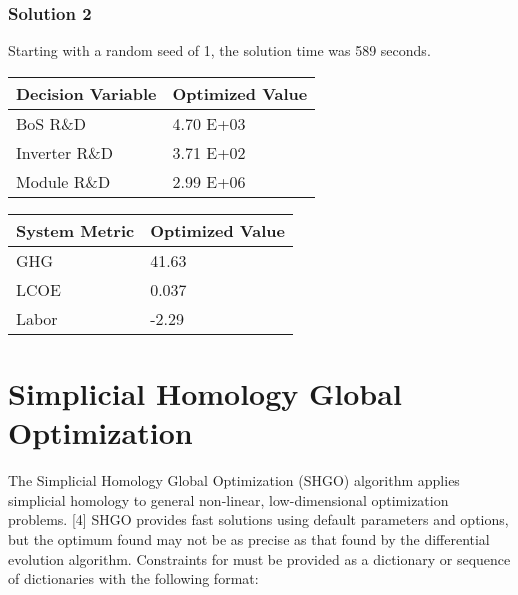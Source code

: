 \documentclass[letterpaper,10pt,english]{sphinxmanual}
\begin{document}
\subsubsection{Solution 2}
\label{\detokenize{optimizers:solution-2}}
Starting with a random seed of 1, the solution time was 589 seconds.


\begin{savenotes}\sphinxattablestart
\centering
{}
\sphinxthecaptionisattop
{}\label{\detokenize{optimizers:table-6}}\label{\detokenize{optimizers:tbl-diffevvars2}}
\sphinxaftertopcaption
\begin{tabulary}{\linewidth}[t]{|T|T|}
\hline
\sphinxstyletheadfamily 
Decision Variable
&\sphinxstyletheadfamily 
Optimized Value
\\
\hline
BoS R\&D
&
4.70 E+03
\\
\hline
Inverter R\&D
&
3.71 E+02
\\
\hline
Module R\&D
&
2.99 E+06
\\
\hline
\end{tabulary}
\par
\sphinxattableend\end{savenotes}


\begin{savenotes}\sphinxattablestart
\centering
{}
\sphinxthecaptionisattop
{}\label{\detokenize{optimizers:table-7}}\label{\detokenize{optimizers:tbl-diffevmetrics2}}
\sphinxaftertopcaption
\begin{tabulary}{\linewidth}[t]{|T|T|}
\hline
\sphinxstyletheadfamily 
System Metric
&\sphinxstyletheadfamily 
Optimized Value
\\
\hline
GHG
&
41.63
\\
\hline
LCOE
&
0.037
\\
\hline
Labor
&
-2.29
\\
\hline
\end{tabulary}
\par
\sphinxattableend\end{savenotes}


\section{Simplicial Homology Global Optimization}
\label{\detokenize{optimizers:simplicial-homology-global-optimization}}
The Simplicial Homology Global Optimization (SHGO) algorithm applies simplicial homology to general non-linear, low-dimensional optimization problems. {[}4{]} SHGO provides fast solutions using default parameters and options, but the optimum found may not be as precise as that found by the differential evolution algorithm. Constraints for  must be provided as a dictionary or sequence of dictionaries with the following format:
\end{document}
